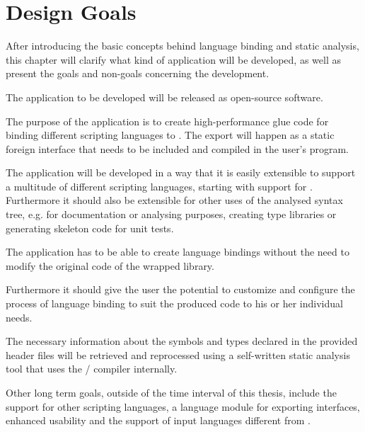 \chapter{Design Goals}
\label{chap:DesignGoals}

After introducing the basic concepts behind language binding and static analysis, this chapter will clarify what kind of application will be developed, as well as present the goals and non-goals concerning the development.

The application to be developed will be released as open-source software.

The purpose of the application is to create high-performance glue code for binding different scripting languages to . The export will happen as a static foreign interface that needs to be included and compiled in the user's program.

The application will be developed in a way that it is easily extensible to support a multitude of different scripting languages, starting with support for  \linebreak {}. Furthermore it should also be \linebreak extensible for other uses of the analysed  syntax tree, e.g. for documentation or analysing purposes, creating type libraries or generating skeleton code for unit tests.

The application has to be able to create language bindings without the need to modify the original code of the wrapped library.

Furthermore it should give the user the potential to customize and configure the process of language binding to suit the produced code to his or her individual needs.

The necessary information about the symbols and types declared in the provided  header files will be retrieved and reprocessed using a self-written static analysis tool that uses the  / compiler internally.

Other long term goals, outside of the time interval of this thesis, include the support for other scripting languages, a language module for exporting  interfaces, enhanced usability and the support of input languages different from .